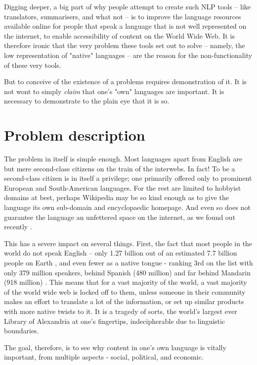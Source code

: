 \documentclass[11pt]{article}
\begin{document}
Digging deeper, a big part of why people attempt to create such NLP tools -- 
like translators, summarisers, and what not -- is to improve the language
resources available online for people that speak a language that is not well
represented on the internet, to enable accessibility of content on the World
Wide Web. It is therefore ironic that the very problem these tools set out to
solve -- namely, the low representation of "native" languages -- are the reason
for the non-functionality of these very tools.

But to conceive of the existence of a problems requires demonstration of it. It
is not wont to simply \textit{claim} that one's "own" languages are important.
It is necessary to demonstrate to the plain eye that it is so.

\section{Problem description}

The problem in itself is simple enough. Most languages apart from English are
but mere second-class citizens on the train of the interwebs. In fact! To be a
second-class citizen is in itself a privilege; one primarily offered only to
prominent European and South-American languages. For the rest are limited to
hobbyist domains at best, perhaps Wikipedia may be so kind enough as to give the
language its own sub-domain and encyclopaedic homepage. And even so does not
guarantee the language an unfettered space on the internet, as we found out
recently \cite{canales_for_2020}. 

This has a severe impact on several things. First, the fact that most people in
the world do not speak English -- only 1.27 billion out of an estimated 7.7
billion people on Earth \cite{ethnologue_english_2019}, and even fewer as a
native tongue - ranking 3rd on the list with only 379 million speakers, behind
Spanish (480 million) and far behind Mandarin (918 million)
\cite{ethnologue_what_2019}. This means that for a vast majority of the world, a
vast majority of the world wide web is locked off to them, unless someone in
their community makes an effort to translate a lot of the information, or set up
similar products with more native twists to it. It is a tragedy of sorts, the
world's largest ever Library of Alexandria at one's fingertips, indecipherable
due to linguistic boundaries.

The goal, therefore, is to see why content in one's own language is vitally
important, from multiple aspects - social, political, and economic.
\end{document}
